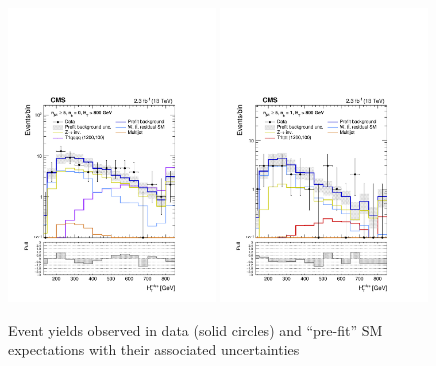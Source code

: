 \begin{figure}[!t]
  \begin{center}
    \includegraphics[width=0.49\textwidth]{figures/mht_shapes/v2/postFitShape_eq0b_ge5j_800_Inf_prefit} 
    \includegraphics[width=0.49\textwidth]{figures/mht_shapes/v2/postFitShape_eq1b_ge5j_800_Inf_prefit} \\
  \end{center}
  \caption{Event yields observed in data (solid circles) and
    ``pre-fit'' SM expectations with their associated uncertainties
}
\end{figure}
